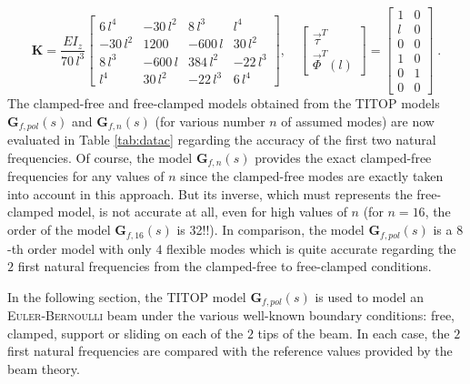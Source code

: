 \documentclass[smallcondensed]{svjour3}     %
\begin{document}
\begin{equation}\label{eq:raideur}
\mathbf{K}=\frac{EI_z}{70\,l^3}\left[\begin{array}{cccc}
            6\,l^4 & -30\,l^2 &8\,l^3  &    l^4\\
                -30\,l^2 & 1200  & -600\,l & 30\,l^2\\
                 8\,l^3& -600\,l& 384\,l^2& -22\,l^3\\
                 l^4  & 30\,l^2 &-22\,l^3   &6\,l^4 
\end{array}\right],\quad
\left[\begin{array}{c} \vec{\tau}^T\\ \hline \vec{\Phi}^T(l)
\end{array}\right]=
\left[\begin{array}{cc}
1 & 0 \\l & 0\\ \hline 0& 0\\ 1 &0 \\0 & 1\\ 0 & 0
\end{array}\right]\;.
\end{equation}
The clamped-free and free-clamped models obtained  from the TITOP models $\mathbf{G}_{f,pol}(s)$ and $\mathbf{G}_{f,n}(s)$ (for various number $n$ of assumed modes) are now evaluated in Table \ref{tab:datac} regarding the accuracy of the first two natural frequencies. Of course, the model $\mathbf{G}_{f,n}(s)$ provides the exact clamped-free frequencies for any values of $n$ since the clamped-free modes are exactly taken into account in this approach. But its inverse, which must represents the free-clamped model, is not accurate at all, even for high values of $n$ (for $n=16$, the order of the model $\mathbf{G}_{f,16}(s)$ is 32!!). In comparison, the model $\mathbf{G}_{f,pol}(s)$ is a $8$-th order model with only $4$ flexible modes which is quite accurate regarding the $2$ first natural frequencies from the clamped-free to free-clamped conditions.

In the following section, the TITOP model $\mathbf{G}_{f,pol}(s)$ is used to model an \textsc{Euler-Bernoulli} beam under the various well-known boundary conditions: free, clamped, support or sliding on each of the $2$ tips of the beam. In each case, the $2$ first natural frequencies are compared with the reference values provided by the beam theory.
\end{document}
